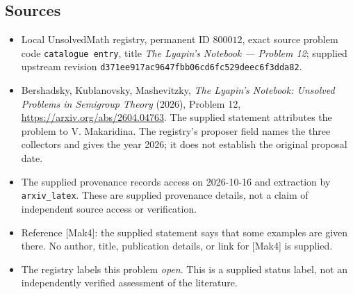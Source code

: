 \documentclass[11pt]{article}
\begin{document}
\subsection{Sources}
\begin{itemize}
\item Local UnsolvedMath registry, permanent ID \(800012\), exact source problem code \texttt{catalogue entry}, title \emph{The Lyapin's Notebook --- Problem 12}; supplied upstream revision \texttt{d371ee917ac9647fbb06cd6fc529deec6f3dda82}.
\item Bershadsky, Kublanovsky, Mashevitzky, \emph{The Lyapin's Notebook: Unsolved Problems in Semigroup Theory} (2026), Problem 12, \url{https://arxiv.org/abs/2604.04763}. The supplied statement attributes the problem to V. Makaridina. The registry's proposer field names the three collectors and gives the year 2026; it does not establish the original proposal date.
\item The supplied provenance records access on 2026-10-16 and extraction by \texttt{arxiv\_latex}. These are supplied provenance details, not a claim of independent source access or verification.
\item Reference [Mak4]: the supplied statement says that some examples are given there. No author, title, publication details, or link for [Mak4] is supplied.
\item The registry labels this problem \emph{open}. This is a supplied status label, not an independently verified assessment of the literature.
\end{itemize}
\end{document}
